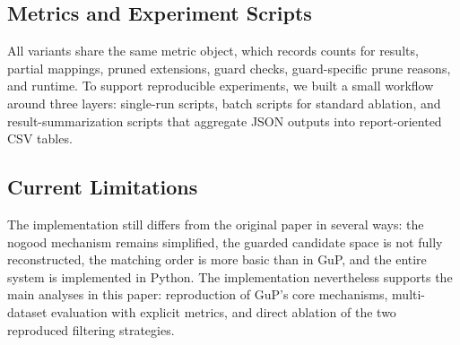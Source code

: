 \subsection{Metrics and Experiment Scripts}

All variants share the same metric object, which records counts for results, partial mappings, pruned extensions, guard checks, guard-specific prune reasons, and runtime. To support reproducible experiments, we built a small workflow around three layers: single-run scripts, batch scripts for standard ablation, and result-summarization scripts that aggregate JSON outputs into report-oriented CSV tables.

\subsection{Current Limitations}

The implementation still differs from the original paper in several ways: the nogood mechanism remains simplified, the guarded candidate space is not fully reconstructed, the matching order is more basic than in GuP, and the entire system is implemented in Python. The implementation nevertheless supports the main analyses in this paper: reproduction of GuP's core mechanisms, multi-dataset evaluation with explicit metrics, and direct ablation of the two reproduced filtering strategies.
